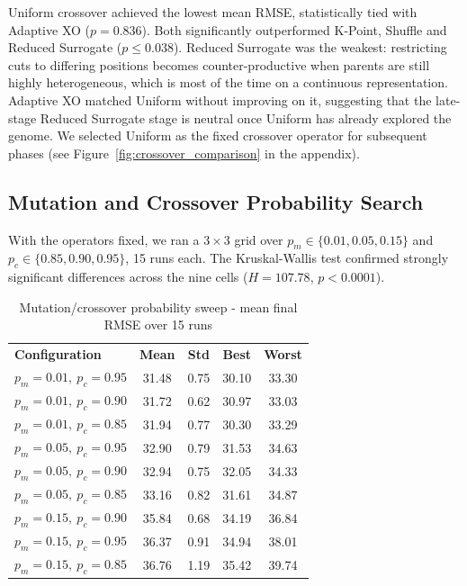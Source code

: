 \documentclass[11pt,a4paper]{article}
\newcommand{\tH}[1]{\textcolor{novagreen}{\textbf{#1}}}
\newcommand{\gmid}{\arrayrulecolor{novagreen}\midrule\arrayrulecolor{black}}
\begin{document}
Uniform crossover achieved the lowest mean RMSE, statistically tied with
Adaptive XO ($p = 0.836$). Both significantly outperformed K-Point, Shuffle
and Reduced Surrogate ($p \leq 0.038$). Reduced Surrogate was the weakest:
restricting cuts to differing positions becomes counter-productive when
parents are still highly heterogeneous, which is most of the time on a
continuous representation. Adaptive XO matched Uniform without improving on
it, suggesting that the late-stage Reduced Surrogate stage is neutral once
Uniform has already explored the genome. We selected Uniform as the fixed
crossover operator for subsequent phases (see Figure~\ref{fig:crossover_comparison} in the appendix).

\subsection{Mutation and Crossover Probability Search}

With the operators fixed, we ran a $3 \times 3$ grid over
$p_m \in \{0.01, 0.05, 0.15\}$ and $p_c \in \{0.85, 0.90, 0.95\}$, 15 runs
each. The Kruskal-Wallis test confirmed strongly significant differences
across the nine cells ($H = 107.78$, $p < 0.0001$).

\begin{table}[h]
\centering
\begin{tabular}{lcccc}
\toprule
\tH{Configuration} & \tH{Mean} & \tH{Std} & \tH{Best} & \tH{Worst} \\
\gmid
$p_m=0.01,\ p_c=0.95$ & 31.48 & 0.75 & 30.10 & 33.30 \\
$p_m=0.01,\ p_c=0.90$ & 31.72 & 0.62 & 30.97 & 33.03 \\
$p_m=0.01,\ p_c=0.85$ & 31.94 & 0.77 & 30.30 & 33.29 \\
$p_m=0.05,\ p_c=0.95$ & 32.90 & 0.79 & 31.53 & 34.63 \\
$p_m=0.05,\ p_c=0.90$ & 32.94 & 0.75 & 32.05 & 34.33 \\
$p_m=0.05,\ p_c=0.85$ & 33.16 & 0.82 & 31.61 & 34.87 \\
$p_m=0.15,\ p_c=0.90$ & 35.84 & 0.68 & 34.19 & 36.84 \\
$p_m=0.15,\ p_c=0.95$ & 36.37 & 0.91 & 34.94 & 38.01 \\
$p_m=0.15,\ p_c=0.85$ & 36.76 & 1.19 & 35.42 & 39.74 \\
\bottomrule
\end{tabular}
\caption{Mutation/crossover probability sweep - mean final RMSE over 15 runs}
\end{table}
\end{document}
